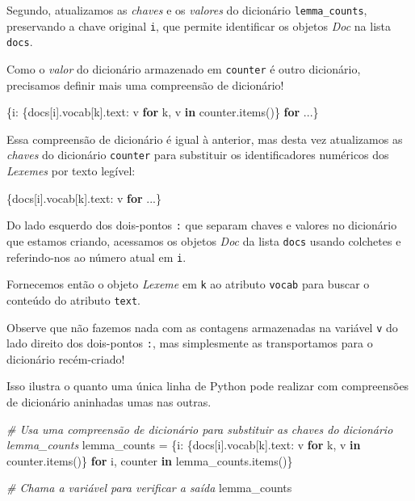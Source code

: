 \documentclass[
  brazilian,
]{article}
\newenvironment{Shaded}{}{}
\newcommand{\CommentTok}[1]{\textcolor[rgb]{0.38,0.63,0.69}{\textit{#1}}}
\newcommand{\ControlFlowTok}[1]{\textcolor[rgb]{0.00,0.44,0.13}{\textbf{#1}}}
\newcommand{\KeywordTok}[1]{\textcolor[rgb]{0.00,0.44,0.13}{\textbf{#1}}}
\newcommand{\NormalTok}[1]{#1}
\newcommand{\OperatorTok}[1]{\textcolor[rgb]{0.40,0.40,0.40}{#1}}
\begin{document}
Segundo, atualizamos as \emph{chaves} e os \emph{valores} do dicionário
\texttt{lemma\_counts}, preservando a chave original \texttt{i}, que
permite identificar os objetos \emph{Doc} na lista \texttt{docs}.

Como o \emph{valor} do dicionário armazenado em \texttt{counter} é outro
dicionário, precisamos definir mais uma compreensão de dicionário!

\begin{Shaded}
\begin{Highlighting}[]
\NormalTok{\{i: \{docs[i].vocab[k].text: v }\ControlFlowTok{for}\NormalTok{ k, v }\KeywordTok{in}\NormalTok{ counter.items()\} }\ControlFlowTok{for}\NormalTok{ ...\}}
\end{Highlighting}
\end{Shaded}

Essa compreensão de dicionário é igual à anterior, mas desta vez
atualizamos as \emph{chaves} do dicionário \texttt{counter} para
substituir os identificadores numéricos dos \emph{Lexemes} por texto
legível:

\begin{Shaded}
\begin{Highlighting}[]
\NormalTok{\{docs[i].vocab[k].text: v }\ControlFlowTok{for}\NormalTok{ ...\}}
\end{Highlighting}
\end{Shaded}

Do lado esquerdo dos dois-pontos \texttt{:} que separam chaves e valores
no dicionário que estamos criando, acessamos os objetos \emph{Doc} da
lista \texttt{docs} usando colchetes e referindo-nos ao número atual em
\texttt{i}.

Fornecemos então o objeto \emph{Lexeme} em \texttt{k} ao atributo
\texttt{vocab} para buscar o conteúdo do atributo \texttt{text}.

Observe que não fazemos nada com as contagens armazenadas na variável
\texttt{v} do lado direito dos dois-pontos \texttt{:}, mas simplesmente
as transportamos para o dicionário recém-criado!

Isso ilustra o quanto uma única linha de Python pode realizar com
compreensões de dicionário aninhadas umas nas outras.

\begin{Shaded}
\begin{Highlighting}[]
\CommentTok{\# Usa uma compreensão de dicionário para substituir as chaves do dicionário \textquotesingle{}lemma\_counts\textquotesingle{}}
\NormalTok{lemma\_counts }\OperatorTok{=}\NormalTok{ \{i: \{docs[i].vocab[k].text: v }\ControlFlowTok{for}\NormalTok{ k, v }\KeywordTok{in}\NormalTok{ counter.items()\} }\ControlFlowTok{for}\NormalTok{ i, counter }\KeywordTok{in}\NormalTok{ lemma\_counts.items()\}}

\CommentTok{\# Chama a variável para verificar a saída}
\NormalTok{lemma\_counts}
\end{Highlighting}
\end{Shaded}
\end{document}
